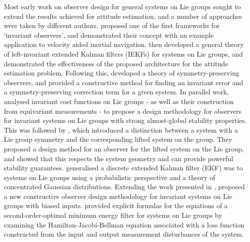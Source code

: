 \documentclass{article}
\begin{document}
Most early work on observer design for general systems on Lie groups sought to extend the results achieved for attitude estimation, and a number of approaches were taken by different authors.
\cite{bonnabel2006non} proposed one of the first frameworks for `invariant observers', and demonstrated their concept with an example application to velocity aided inertial navigation. 
\cite{bonnabel2007left} then developed a general theory of left-invariant extended Kalman filters (IEKFs) for systems on Lie groups, and demonstrated the effectiveness of the proposed architecture for the attitude estimation problem.
Following this, \cite{bonnabel2008symmetry} developed a theory of symmetry-preserving observers, and provided a constructive method for finding an invariant error and a symmetry-preserving correction term for a given system. 
In parallel work, \cite{lageman2009gradient} analysed invariant cost functions on Lie groups - as well as their construction from equivariant measurements - to propose a design methodology for observers for invariant systems on Lie groups with strong almost-global stability properties.
This was followed by \cite{mahony2013observers}, which introduced a distinction between a system with a Lie group symmetry and the corresponding lifted system on the group.
They proposed a design method for an observer for the lifted system on the Lie group, and showed that this respects the system geometry and can provide powerful stability guarantees.
\cite{bourmaud2013discrete} generalised a discrete extended Kalman filter (EKF) was to systems on Lie groups using a probabilistic perspective and a theory of concentrated Gaussian distributions.
Extending the work presented in \cite{mahony2013observers}, \cite{khosravian2015observers} proposed a new constructive observer design methodology for invariant systems on Lie groups with biased inputs.
\cite{saccon2015second} provided explicit formulas for the equations of a second-order-optimal minimum energy filter for systems on Lie groups by examining the Hamilton-Jacobi-Bellman equation associated with a loss function constructed from the input and output measurement disturbances of the system.
\end{document}
